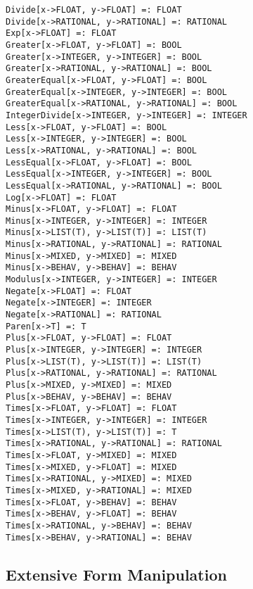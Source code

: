 \begin{verbatim}
Divide[x->FLOAT, y->FLOAT] =: FLOAT
Divide[x->RATIONAL, y->RATIONAL] =: RATIONAL
Exp[x->FLOAT] =: FLOAT
Greater[x->FLOAT, y->FLOAT] =: BOOL
Greater[x->INTEGER, y->INTEGER] =: BOOL
Greater[x->RATIONAL, y->RATIONAL] =: BOOL
GreaterEqual[x->FLOAT, y->FLOAT] =: BOOL
GreaterEqual[x->INTEGER, y->INTEGER] =: BOOL
GreaterEqual[x->RATIONAL, y->RATIONAL] =: BOOL
IntegerDivide[x->INTEGER, y->INTEGER] =: INTEGER
Less[x->FLOAT, y->FLOAT] =: BOOL
Less[x->INTEGER, y->INTEGER] =: BOOL
Less[x->RATIONAL, y->RATIONAL] =: BOOL
LessEqual[x->FLOAT, y->FLOAT] =: BOOL
LessEqual[x->INTEGER, y->INTEGER] =: BOOL
LessEqual[x->RATIONAL, y->RATIONAL] =: BOOL
Log[x->FLOAT] =: FLOAT
Minus[x->FLOAT, y->FLOAT] =: FLOAT
Minus[x->INTEGER, y->INTEGER] =: INTEGER
Minus[x->LIST(T), y->LIST(T)] =: LIST(T)
Minus[x->RATIONAL, y->RATIONAL] =: RATIONAL
Minus[x->MIXED, y->MIXED] =: MIXED
Minus[x->BEHAV, y->BEHAV] =: BEHAV
Modulus[x->INTEGER, y->INTEGER] =: INTEGER
Negate[x->FLOAT] =: FLOAT
Negate[x->INTEGER] =: INTEGER
Negate[x->RATIONAL] =: RATIONAL
Paren[x->T] =: T
Plus[x->FLOAT, y->FLOAT] =: FLOAT
Plus[x->INTEGER, y->INTEGER] =: INTEGER
Plus[x->LIST(T), y->LIST(T)] =: LIST(T)
Plus[x->RATIONAL, y->RATIONAL] =: RATIONAL
Plus[x->MIXED, y->MIXED] =: MIXED
Plus[x->BEHAV, y->BEHAV] =: BEHAV
Times[x->FLOAT, y->FLOAT] =: FLOAT
Times[x->INTEGER, y->INTEGER] =: INTEGER
Times[x->LIST(T), y->LIST(T)] =: T
Times[x->RATIONAL, y->RATIONAL] =: RATIONAL
Times[x->FLOAT, y->MIXED] =: MIXED
Times[x->MIXED, y->FLOAT] =: MIXED
Times[x->RATIONAL, y->MIXED] =: MIXED
Times[x->MIXED, y->RATIONAL] =: MIXED
Times[x->FLOAT, y->BEHAV] =: BEHAV
Times[x->BEHAV, y->FLOAT] =: BEHAV
Times[x->RATIONAL, y->BEHAV] =: BEHAV
Times[x->BEHAV, y->RATIONAL] =: BEHAV
\end{verbatim}

\subsection{Extensive Form Manipulation}

